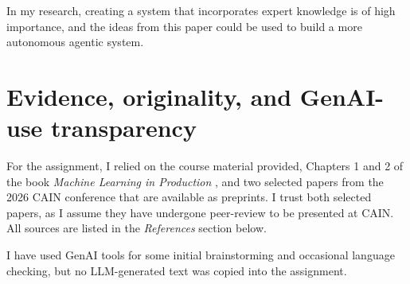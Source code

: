 \documentclass[11pt]{article}
\begin{document}
In my research, creating a system that incorporates expert knowledge is of high importance, and the ideas from this paper could be used to build a more autonomous agentic system.


\section{Evidence, originality, and GenAI-use transparency}

For the assignment, I relied on the course material provided, Chapters 1 and 2 of the book \textit{Machine Learning in Production} \cite{kastner2025machine}, and two selected papers \cite{brehme2026rag, kulyabin2026build} from the 2026 CAIN conference that are available as preprints. I trust both selected papers, as I assume they have undergone peer-review to be presented at CAIN. All sources are listed in the \textit{References} section below.

I have used GenAI tools for some initial brainstorming and occasional language checking, but no LLM-generated text was copied into the assignment.





\end{document}
